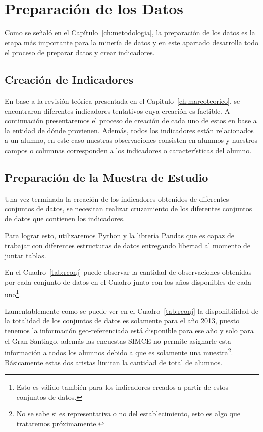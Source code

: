\section{Preparación de los Datos}
Como se señaló en el Capítulo~\ref{ch:metodologia}, la preparación de los datos es la etapa más importante para la minería de datos y en este apartado desarrolla todo el proceso de preparar datos y crear indicadores. 

\subsection{Creación de Indicadores}
En base a la revisión teórica presentada en el Capitulo~\ref{ch:marcoteorico}, se encontraron diferentes indicadores tentativos cuya creación es factible.
A continuación presentaremos el proceso de creación de cada uno de estos en base a la entidad de dónde provienen. Además, todos los indicadores están relacionados a un alumno, en este caso nuestras observaciones consisten en alumnos y nuestros campos o columnas corresponden a los indicadores o características del alumno.

\subsection{Preparación de la Muestra de Estudio}
Una vez terminada la creación de los indicadores obtenidos de diferentes conjuntos de datos, se necesitan realizar cruzamiento de los diferentes conjuntos de datos que contienen los indicadores.

Para lograr esto, utilizaremos Python y la librería Pandas que es capaz de trabajar con diferentes estructuras de datos entregando libertad al momento de juntar tablas.

En el Cuadro~\ref{tab:rconj} puede observar la cantidad de observaciones obtenidas por cada conjunto de datos en el Cuadro junto con los años disponibles de cada uno\footnote{Esto es válido también para los indicadores creados a partir de estos conjuntos de datos.}.

Lamentablemente como se puede ver en el Cuadro~\ref{tab:rconj} la disponibilidad de la totalidad de los conjuntos de datos es solamente para el año 2013, puesto tenemos la información geo-referenciada está disponible para ese año y solo para el Gran Santiago, además las encuestas SIMCE no permite asignarle esta información a todos los alumnos debido a que es solamente una muestra\footnote{No se sabe si es representativa o no del establecimiento, esto es algo que trataremos próximamente.}. Básicamente estas dos aristas limitan la cantidad de total de alumnos.

